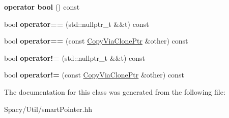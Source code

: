 \begin{DoxyCompactItemize}
\item 
\hypertarget{classSpacy_1_1CopyViaClonePtr_ad0f35fa8874bd1e69cc1cb942007ac6d}{}{\bfseries operator bool} () const \label{classSpacy_1_1CopyViaClonePtr_ad0f35fa8874bd1e69cc1cb942007ac6d}

\item 
\hypertarget{classSpacy_1_1CopyViaClonePtr_a15df9f14f72908ab90f83e927bfacfe0}{}bool {\bfseries operator==} (std\+::nullptr\+\_\+t \&\&t) const \label{classSpacy_1_1CopyViaClonePtr_a15df9f14f72908ab90f83e927bfacfe0}

\item 
\hypertarget{classSpacy_1_1CopyViaClonePtr_a7b4cbb820ed9bc18bbb7f3a09b8bc419}{}bool {\bfseries operator==} (const \hyperlink{classSpacy_1_1CopyViaClonePtr}{Copy\+Via\+Clone\+Ptr} \&other) const \label{classSpacy_1_1CopyViaClonePtr_a7b4cbb820ed9bc18bbb7f3a09b8bc419}

\item 
\hypertarget{classSpacy_1_1CopyViaClonePtr_aaa155afa9c3d141bfbe93059f5a8d760}{}bool {\bfseries operator!=} (std\+::nullptr\+\_\+t \&\&t) const \label{classSpacy_1_1CopyViaClonePtr_aaa155afa9c3d141bfbe93059f5a8d760}

\item 
\hypertarget{classSpacy_1_1CopyViaClonePtr_a6dcd75f282b0597b620dddf859bc7272}{}bool {\bfseries operator!=} (const \hyperlink{classSpacy_1_1CopyViaClonePtr}{Copy\+Via\+Clone\+Ptr} \&other) const \label{classSpacy_1_1CopyViaClonePtr_a6dcd75f282b0597b620dddf859bc7272}

\end{DoxyCompactItemize}


The documentation for this class was generated from the following file\+:\begin{DoxyCompactItemize}
\item 
Spacy/\+Util/smart\+Pointer.\+hh\end{DoxyCompactItemize}

